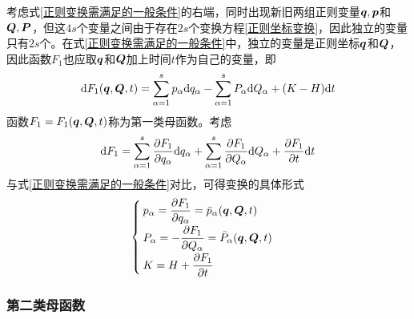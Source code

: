 考虑式\eqref{正则变换需满足的一般条件}的右端，同时出现新旧两组正则变量$\boldsymbol{q},\boldsymbol{p}$和$\boldsymbol{Q},\boldsymbol{P}$，但这$4s$个变量之间由于存在$2s$个变换方程\eqref{正则坐标变换}，因此独立的变量只有$2s$个。在式\eqref{正则变换需满足的一般条件}中，独立的变量是正则坐标$\boldsymbol{q}$和$\boldsymbol{Q}$，因此函数$F_1$也应取$\boldsymbol{q}$和$\boldsymbol{Q}$加上时间$t$作为自己的变量，即
\begin{equation}
	\mathrm{d} F_1(\boldsymbol{q},\boldsymbol{Q},t) = \sum_{\alpha=1}^s p_\alpha \mathrm{d} q_\alpha - \sum_{\alpha=1}^s P_\alpha \mathrm{d} Q_\alpha + (K-H) \mathrm{d} t
	\label{第一类母函数下的正则变换}
\end{equation}
函数$F_1 = F_1(\boldsymbol{q},\boldsymbol{Q},t)$称为{\heiti 第一类母函数}。考虑
\begin{equation*}
	\mathrm{d} F_1 = \sum_{\alpha=1}^s \frac{\partial F_1}{\partial q_\alpha} \mathrm{d} q_\alpha + \sum_{\alpha=1}^s \frac{\partial F_1}{\partial Q_\alpha} \mathrm{d} Q_\alpha + \frac{\partial F_1}{\partial t} \mathrm{d} t
\end{equation*}
与式\eqref{正则变换需满足的一般条件}对比，可得变换的具体形式
\begin{equation}
	\begin{cases}
		\displaystyle p_\alpha = \frac{\partial F_1}{\partial q_\alpha} = \bar{p}_\alpha(\boldsymbol{q},\boldsymbol{Q},t) \\[1.5ex]
		\displaystyle P_\alpha = -\frac{\partial F_1}{\partial Q_\alpha} = \bar{P}_\alpha(\boldsymbol{q},\boldsymbol{Q},t) \\[1.5ex]
		\displaystyle K = H+\frac{\partial F_1}{\partial t}
	\end{cases}
\end{equation}

\subsubsection{第二类母函数}

